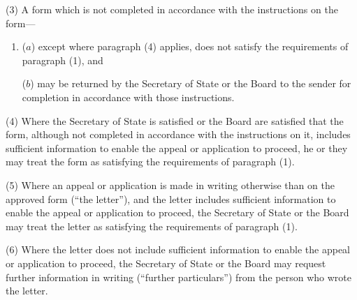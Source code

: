 \documentclass[12pt,a4paper]{article}
\begin{document}
(3) A form which is not completed in accordance with the instructions on the form—
\begin{enumerate}\item[]
($a$) except where paragraph (4) applies, does not satisfy the requirements of paragraph (1), and

($b$) may be returned by the Secretary of State 
or the Board   %
to the sender for completion in accordance with those instructions.
\end{enumerate}

(4) Where the Secretary of State is satisfied 
or the Board are satisfied   %
that the form, although not completed in accordance with the instructions on it, includes sufficient information to enable the appeal or application to proceed, he 
or they   %
may treat the form as satisfying the requirements of paragraph (1).

(5) Where an appeal or application is made in writing otherwise than on the approved form (“the letter”), and the letter includes sufficient information to enable the appeal or application to proceed, the Secretary of State 
or the Board   %
may treat the letter as satisfying the requirements of paragraph (1).

(6) Where the letter does not include sufficient information to enable the appeal or application to proceed, the Secretary of State 
or the Board   %
may request further information in writing (“further particulars”) from the person who wrote the letter.

%
%
\end{document}
